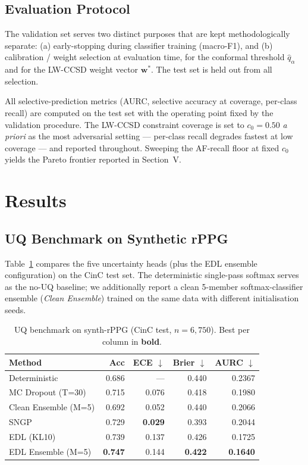 \documentclass[journal]{IEEEtran}
\begin{document}
\subsection{Evaluation Protocol}
The validation set serves two distinct purposes that are kept methodologically separate: (a) early-stopping during classifier training (macro-F1), and (b) calibration / weight selection at evaluation time, for the conformal threshold $\hat{q}_\alpha$ and for the LW-CCSD weight vector $\mathbf{w}^{*}$. The test set is held out from all selection.

All selective-prediction metrics (AURC, selective accuracy at coverage, per-class recall) are computed on the test set with the operating point fixed by the validation procedure. The LW-CCSD constraint coverage is set to $c_0 = 0.50$ \emph{a priori} as the most adversarial setting --- per-class recall degrades fastest at low coverage --- and reported throughout. Sweeping the AF-recall floor at fixed $c_0$ yields the Pareto frontier reported in Section~V.

\section{Results}
\subsection{UQ Benchmark on Synthetic rPPG}
Table~\ref{tab:uq_comparison} compares the five uncertainty heads (plus the EDL ensemble configuration) on the CinC test set. The deterministic single-pass softmax serves as the no-UQ baseline; we additionally report a clean 5-member softmax-classifier ensemble (\emph{Clean Ensemble}) trained on the same data with different initialisation seeds.

\begin{table}[t]
\centering
\caption{UQ benchmark on synth-rPPG (CinC test, $n{=}6{,}750$). Best per column in \textbf{bold}.}
\label{tab:uq_comparison}
\begin{tabular}{lrrrr}
\toprule
Method & Acc & ECE $\downarrow$ & Brier $\downarrow$ & AURC $\downarrow$ \\
\midrule
Deterministic            & 0.686 & ---            & 0.440          & 0.2367 \\
MC Dropout (T{=}30)      & 0.715 & 0.076          & 0.418          & 0.1980 \\
Clean Ensemble (M{=}5)   & 0.692 & 0.052          & 0.440          & 0.2066 \\
SNGP                     & 0.729 & \textbf{0.029} & 0.393          & 0.2044 \\
EDL (KL10)               & 0.739 & 0.137          & 0.426          & 0.1725 \\
EDL Ensemble (M{=}5)     & \textbf{0.747} & 0.144 & \textbf{0.422} & \textbf{0.1640} \\
\bottomrule
\end{tabular}
\end{table}
\end{document}
